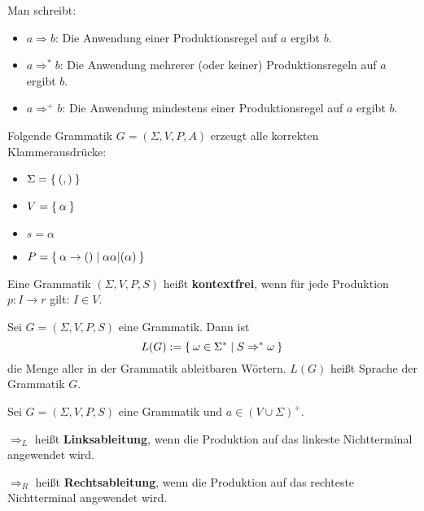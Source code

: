 Man schreibt:

\begin{itemize}
	\item $a \Rightarrow b$: Die Anwendung einer Produktionsregel auf $a$ ergibt $b$.
	\item $a \Rightarrow^* b$: Die Anwendung mehrerer (oder keiner) Produktionsregeln auf
	$a$ ergibt $b$.
	\item $a \Rightarrow^+ b$: Die Anwendung mindestens einer Produktionsregel auf $a$
	ergibt $b$.
\end{itemize}

\begin{beispiel}
	Folgende Grammatik $G = (\Sigma, V, P, A)$ erzeugt alle korrekten Klammerausdrücke:

	\begin{itemize}
		\item $\Sigma = \Set{(, )}$
		\item $V = \Set{\alpha}$
		\item $s = \alpha$
		\item $P = \Set{\alpha \rightarrow () | \alpha \alpha | (\alpha)}$
	\end{itemize}
\end{beispiel}

\begin{definition}%
	Eine Grammatik $(\Sigma, V, P, S)$ heißt \textbf{kontextfrei}, wenn für 
	jede Produktion $p: I \rightarrow r$ gilt: $I \in V$.
\end{definition}

\begin{definition}[Sprache]%
	Sei $G = (\Sigma, V, P, S)$ eine Grammatik. Dann ist
	\[L(G) := \Set{\omega \in \Sigma^* | S \Rightarrow^* \omega}\]
	die Menge aller in der Grammatik ableitbaren Wörtern. $L(G)$ heißt Sprache 
	der Grammatik $G$.
\end{definition}

\begin{definition}%
    Sei $G = (\Sigma, V, P, S)$ eine Grammatik und $a \in (V \cup \Sigma)^+$.
    \begin{defenum}
        \item $\Rightarrow_L$ heißt \textbf{Linksableitung}, wenn die Produktion
              auf das linkeste Nichtterminal angewendet wird.
        \item $\Rightarrow_R$ heißt \textbf{Rechtsableitung}, wenn die Produktion
              auf das rechteste Nichtterminal angewendet wird.
    \end{defenum}
\end{definition}

